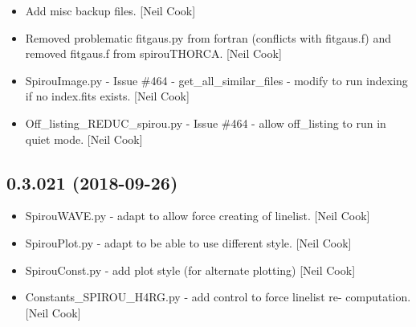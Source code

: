 \documentclass[a4paper,10pt,english]{report}
\begin{document}
\begin{itemize}
\item {} 
Add misc backup files. {[}Neil Cook{]}

\item {} 
Removed problematic fitgaus.py from fortran (conflicts with fitgaus.f)
and removed fitgaus.f from spirouTHORCA. {[}Neil Cook{]}

\item {} 
SpirouImage.py - Issue \#464 - get\_all\_similar\_files - modify to run
indexing if no index.fits exists. {[}Neil Cook{]}

\item {} 
Off\_listing\_REDUC\_spirou.py - Issue \#464 - allow off\_listing to run in
quiet mode. {[}Neil Cook{]}

\end{itemize}


\subsection{0.3.021 (2018-09-26)}
\label{\detokenize{misc/changelog:id309}}\begin{itemize}
\item {} 
SpirouWAVE.py - adapt to allow force creating of linelist. {[}Neil Cook{]}

\item {} 
SpirouPlot.py - adapt to be able to use different style. {[}Neil Cook{]}

\item {} 
SpirouConst.py - add plot style (for alternate plotting) {[}Neil Cook{]}

\item {} 
Constants\_SPIROU\_H4RG.py - add control to force linelist re-
computation. {[}Neil Cook{]}

\end{itemize}
\end{document}
